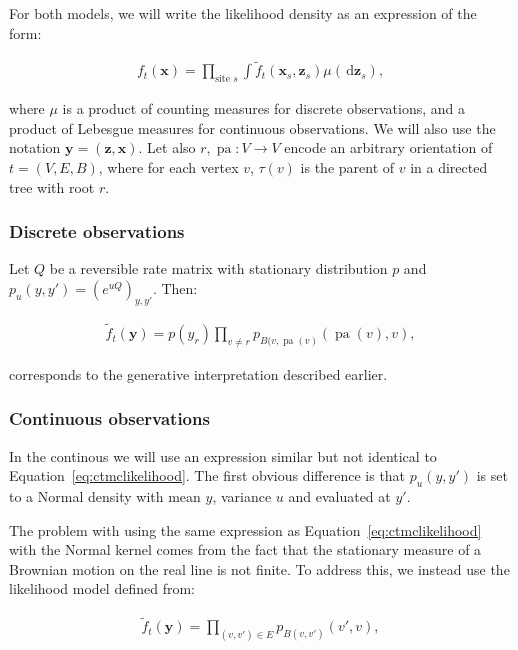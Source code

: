 \documentclass {article}
\DeclareMathOperator{\parent}{pa}
\newcommand\data{\pmb{x}}
\newcommand\hidden{\pmb{z}}
\newcommand\anyvalue{\pmb{y}}
\newcommand{\ud}{\,\mathrm{d}}
\begin{document}
For both models, we will write the likelihood density as an expression of the form:

\begin{align*} 
f_t(\data) = \prod_{\textrm{site }s} \int \tilde f_t(\data_s,\hidden_s) \mu(\ud \hidden_s),
\end{align*}

where $\mu$ is a product of counting measures for discrete observations, and a product of Lebesgue measures for continuous observations.  We will also use the notation $\anyvalue = (\hidden, \data)$.  Let also $r, \parent : V \to V$ encode an arbitrary orientation of $t = (V,E,B)$, where for each vertex $v$, $\tau(v)$ is the parent of $v$ in a directed tree with root $r$.

\subsubsection*{Discrete observations}

Let $Q$ be a reversible rate matrix with stationary distribution $p$ and $p_u(y,y') = \left(e^{u Q}\right)_{y,y'}$. Then:

\begin{align}\label{eq:ctmclikelihood}
\tilde f_t(\anyvalue) = p(y_r) \prod_{v \neq r} p_{B(v,\parent(v)}(\parent(v),v), 
\end{align}

corresponds to the generative interpretation described earlier.

\subsubsection{Continuous observations}

In the continous we will use an expression similar but not identical to Equation~\ref{eq:ctmclikelihood}.  The first obvious difference is that $p_u(y,y')$ is set to a Normal density with mean $y$, variance $u$ and evaluated at $y'$.  

The problem with using the same expression as Equation~\ref{eq:ctmclikelihood} with the Normal kernel comes from the fact that the stationary measure of a Brownian motion on the real line is not finite.  To address this, we instead use the likelihood model defined from:

\begin{align}\label{eq:ctmclikelihood}
\tilde f_t(\anyvalue) = \prod_{(v,v')\in E} p_{B(v,v')}(v',v), 
\end{align}
\end{document}
